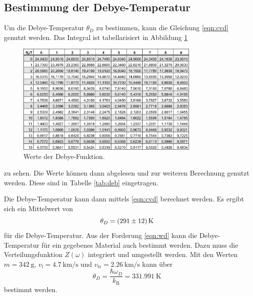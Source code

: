 \subsection{Bestimmung der Debye-Temperatur}
Um die Debye-Temperatur $\theta_D$ zu bestimmen, kann die Gleichung \eqref{eqn:cvd} genutzt werden. Das Integral ist tabellarisiert in Abbildung \ref{fig:cvd}
\begin{figure}
	\centering
	\includegraphics[width=0.8\textwidth]{graphics/cvd.png}
	\caption{Werte der Debye-Funktion.}
	\label{fig:cvd}
\end{figure}
zu sehen.
Die Werte können dann abgelesen und zur weiteren Berechnung genutzt werden.
Diese sind in Tabelle \ref{tab:deb} eingetragen.

Die Debye-Temperatur kann dann mittels \eqref{eqn:cvd} berechnet werden.
Es ergibt sich ein Mittelwert von
\begin{equation*}
	\theta_D = \SI{291\pm12}{\kelvin}
\end{equation*}
für die Debye-Temperatur.
Aus der Forderung \eqref{eqn:wd} kann die Debye-Temperatur für ein gegebenes Material auch bestimmt werden. Dazu muss die Verteilungsfunktion $Z(\omega)$ integriert und umgestellt werden.
Mit den Werten $m = \SI{342}{\gram}$, $v_\text{l} = \SI{4.7}{\kilo\metre\per\second}$ und $v_\text{tr} = \SI{2.26}{\kilo\meter\per\second}$ kann über
\begin{equation*}
	\theta_D = \frac{\hbar\omega_D}{k_\text{B}} = \SI{331.991}{\kelvin}
\end{equation*} bestimmt werden. 
